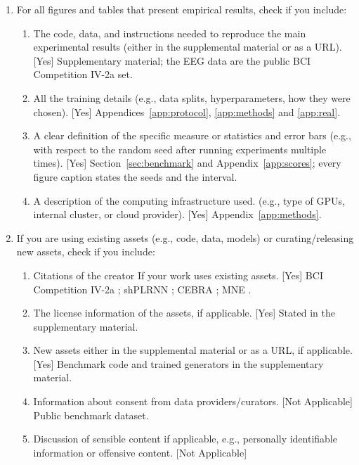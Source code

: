 \begin{enumerate}
  \item For all figures and tables that present empirical results, check if you include:
  \begin{enumerate}
    \item The code, data, and instructions needed to reproduce the main experimental results (either in the supplemental material or as a URL). [Yes] Supplementary material; the EEG data are the public BCI Competition IV-2a set.
    \item All the training details (e.g., data splits, hyperparameters, how they were chosen). [Yes] Appendices~\ref{app:protocol}, \ref{app:methods} and \ref{app:real}.
    \item A clear definition of the specific measure or statistics and error bars (e.g., with respect to the random seed after running experiments multiple times). [Yes] Section~\ref{sec:benchmark} and Appendix~\ref{app:scores}; every figure caption states the seeds and the interval.
    \item A description of the computing infrastructure used. (e.g., type of GPUs, internal cluster, or cloud provider). [Yes] Appendix~\ref{app:methods}.
  \end{enumerate}

  \item If you are using existing assets (e.g., code, data, models) or curating/releasing new assets, check if you include:
  \begin{enumerate}
    \item Citations of the creator If your work uses existing assets. [Yes] BCI Competition IV-2a \citep{brunner2008bci,tangermann2012review}; shPLRNN \citep{brenner2024shPLRNN,hess2023gtf}; CEBRA \citep{schneider2023cebra}; MNE \citep{gramfort2014mne}.
    \item The license information of the assets, if applicable. [Yes] Stated in the supplementary material.
    \item New assets either in the supplemental material or as a URL, if applicable. [Yes] Benchmark code and trained generators in the supplementary material.
    \item Information about consent from data providers/curators. [Not Applicable] Public benchmark dataset.
    \item Discussion of sensible content if applicable, e.g., personally identifiable information or offensive content. [Not Applicable]
  \end{enumerate}


\end{enumerate}
